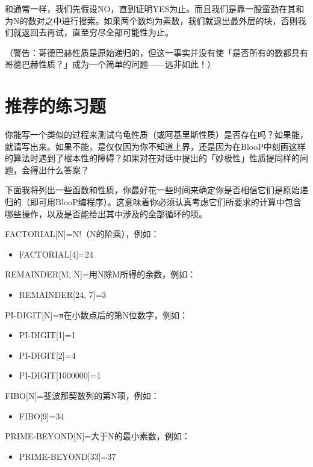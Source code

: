 \documentclass[
  12pt,
  twoside,
  openright,
  oldfontcommands,
]{memoir}
\providecommand{\tightlist}{%
  \setlength{\itemsep}{0pt}\setlength{\parskip}{0pt}}
\begin{document}
和通常一样，我们先假设NO，直到证明YES为止。而且我们是靠一股蛮劲在其和为N的数对之中进行搜索。如果两个数均为素数，我们就退出最外层的块，否则我们就返回去再试，直至穷尽全部可能性为止。

（警告：哥德巴赫性质是原始递归的，但这一事实并没有使「是否所有的数都具有哥德巴赫性质？」成为一个简单的问题------远非如此！）

\section{推荐的练习题}

你能写一个类似的过程来测试乌龟性质（或阿基里斯性质）是否存在吗？如果能，就请写出来。如果不能，是仅仅因为你不知道上界，还是因为在BlooP中刻画这样的算法时遇到了根本性的障碍？如果对在对话中提出的「妙极性」性质提同样的问题，会得出什么答案？

下面我将列出一些函数和性质，你最好花一些时间来确定你是否相信它们是原始递归的（即可用BlooP编程序）。这意味着你必须认真考虑它们所要求的计算中包含哪些操作，以及是否能给出其中涉及的全部循环的项。

FACTORIAL{[}N{]}=N!（N的阶乘），例如：

\begin{itemize}
\tightlist
\item
  FACTORIAL{[}4{]}=24
\end{itemize}

REMAINDER{[}M, N{]}=用N除M所得的余数，例如：

\begin{itemize}
\tightlist
\item
  REMAINDER{[}24, 7{]}=3
\end{itemize}

PI-DIGIT{[}N{]}=π在小数点后的第N位数字，例如：

\begin{itemize}
\tightlist
\item
  PI-DIGIT{[}1{]}=1
\item
  PI-DIGIT{[}2{]}=4
\item
  PI-DIGIT{[}1000000{]}=1
\end{itemize}

FIBO{[}N{]}=斐波那契数列的第N项，例如：

\begin{itemize}
\tightlist
\item
  FIBO{[}9{]}=34
\end{itemize}

PRIME-BEYOND{[}N{]}=大于N的最小素数，例如：

\begin{itemize}
\tightlist
\item
  PRIME-BEYOND{[}33{]}=37
\end{itemize}
\end{document}
